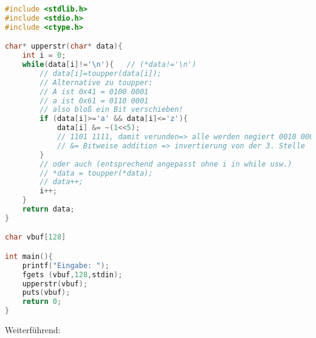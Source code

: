 \documentclass{scrreprt}
\begin{document}
\begin{lstlisting}[language=C]
#include <stdlib.h>
#include <stdio.h>
#include <ctype.h>

char* upperstr(char* data){
	int i = 0;	
	while(data[i]!='\n'){	// (*data!='\n')
		// data[i]=toupper(data[i]);
		// Alternative zu toupper: 
		// A ist 0x41 = 0100 0001
		// a ist 0x61 = 0110 0001
		// also bloß ein Bit verschieben!
		if (data[i]>='a' && data[i]<='z'){
			data[i] &= ~(1<<5); 
			// 1101 1111, damit verunden=> alle werden negiert 0010 0000
			// &= Bitweise addition => invertierung von der 3. Stelle
		}
		// oder auch (entsprechend angepasst ohne i in while usw.)
		// *data = toupper(*data);
		// data++;
		i++;
	}
	return data;
}

char vbuf[128]

int main(){
	printf("Eingabe: ");
	fgets (vbuf,128,stdin);
	upperstr(vbuf);
	puts(vbuf);
	return 0;
}

\end{lstlisting}
Weiterführend:
\end{document}
